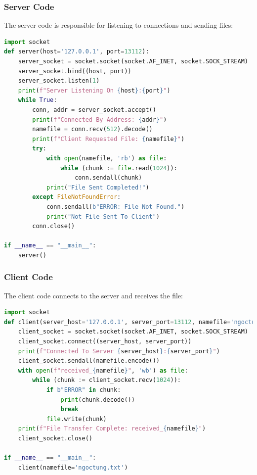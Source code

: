 \documentclass{article}
\begin{document}
\subsubsection{Server Code}
The server code is responsible for listening to connections and sending files:
\begin{lstlisting}[language=Python, caption=Server Code]
import socket
def server(host='127.0.0.1', port=13112):
    server_socket = socket.socket(socket.AF_INET, socket.SOCK_STREAM)
    server_socket.bind((host, port))
    server_socket.listen(1)
    print(f"Server Listening On {host}:{port}")
    while True:
        conn, addr = server_socket.accept()
        print(f"Connected By Address: {addr}")
        namefile = conn.recv(512).decode()
        print(f"Client Requested File: {namefile}")
        try:
            with open(namefile, 'rb') as file:
                while (chunk := file.read(1024)):
                    conn.sendall(chunk)
            print("File Sent Completed!")
        except FileNotFoundError:
            conn.sendall(b"ERROR: File Not Found.")
            print("Not File Sent To Client")
        conn.close()

if __name__ == "__main__":
    server()


\end{lstlisting}

\subsubsection{Client Code}
The client code connects to the server and receives the file:
\begin{lstlisting}[language=Python, caption=Client Code]
import socket
def client(server_host='127.0.0.1', server_port=13112, namefile='ngoctung.txt'):
    client_socket = socket.socket(socket.AF_INET, socket.SOCK_STREAM)
    client_socket.connect((server_host, server_port))
    print(f"Connected To Server {server_host}:{server_port}")
    client_socket.sendall(namefile.encode())
    with open(f"received_{namefile}", 'wb') as file:
        while (chunk := client_socket.recv(1024)):
            if b"ERROR" in chunk:  
                print(chunk.decode())
                break
            file.write(chunk)
    print(f"File Transfer Complete: received_{namefile}")
    client_socket.close()

if __name__ == "__main__":
    client(namefile='ngoctung.txt')



\end{lstlisting}
\end{document}
